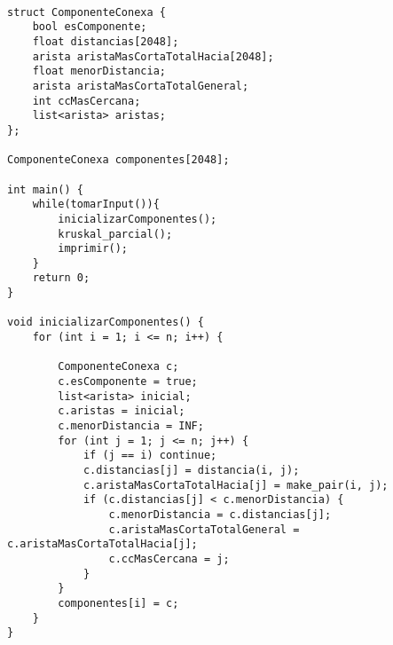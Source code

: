 \documentclass[11pt, a4paper, twoside]{article}
\begin{document}
\begin{lstlisting}
	
struct ComponenteConexa {
    bool esComponente;
    float distancias[2048]; 
    arista aristaMasCortaTotalHacia[2048];
    float menorDistancia;
    arista aristaMasCortaTotalGeneral;
    int ccMasCercana;
    list<arista> aristas;
};

ComponenteConexa componentes[2048];

int main() {
    while(tomarInput()){
    	inicializarComponentes();
    	kruskal_parcial();
    	imprimir();
    }
    return 0;
}

void inicializarComponentes() {
    for (int i = 1; i <= n; i++) {

        ComponenteConexa c;
        c.esComponente = true;
        list<arista> inicial;
        c.aristas = inicial;
        c.menorDistancia = INF;
        for (int j = 1; j <= n; j++) {
            if (j == i) continue;
            c.distancias[j] = distancia(i, j);
            c.aristaMasCortaTotalHacia[j] = make_pair(i, j);
            if (c.distancias[j] < c.menorDistancia) {
                c.menorDistancia = c.distancias[j];
                c.aristaMasCortaTotalGeneral = c.aristaMasCortaTotalHacia[j];
                c.ccMasCercana = j;
            }
        }
        componentes[i] = c;
    }
}



\end{lstlisting}
\end{document}
